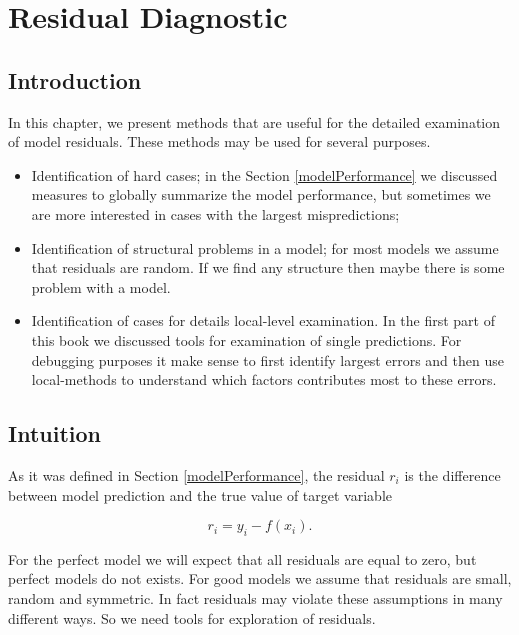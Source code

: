 \documentclass[12pt,]{krantz}
\providecommand{\tightlist}{%
  \setlength{\itemsep}{0pt}\setlength{\parskip}{0pt}}
\begin{document}
\hypertarget{residualDiagnostic}{%
\section{Residual Diagnostic}\label{residualDiagnostic}}

\hypertarget{introduction-1}{%
\subsection{Introduction}\label{introduction-1}}

In this chapter, we present methods that are useful for the detailed examination of model residuals. These methods may be used for several purposes.

\begin{itemize}
\tightlist
\item
  Identification of hard cases; in the Section \ref{modelPerformance} we discussed measures to globally summarize the model performance, but sometimes we are more interested in cases with the largest mispredictions;
\item
  Identification of structural problems in a model; for most models we assume that residuals are random. If we find any structure then maybe there is some problem with a model.
\item
  Identification of cases for details local-level examination. In the first part of this book we discussed tools for examination of single predictions. For debugging purposes it make sense to first identify largest errors and then use local-methods to understand which factors contributes most to these errors.
\end{itemize}

\hypertarget{intuition}{%
\subsection{Intuition}\label{intuition}}

As it was defined in Section \ref{modelPerformance}, the residual \(r_i\) is the difference between model prediction and the true value of target variable

\[
r_i = y_i - f(x_i).
\]

For the perfect model we will expect that all residuals are equal to zero, but perfect models do not exists.
For good models we assume that residuals are small, random and symmetric. In fact residuals may violate these assumptions in many different ways. So we need tools for exploration of residuals.
\end{document}
